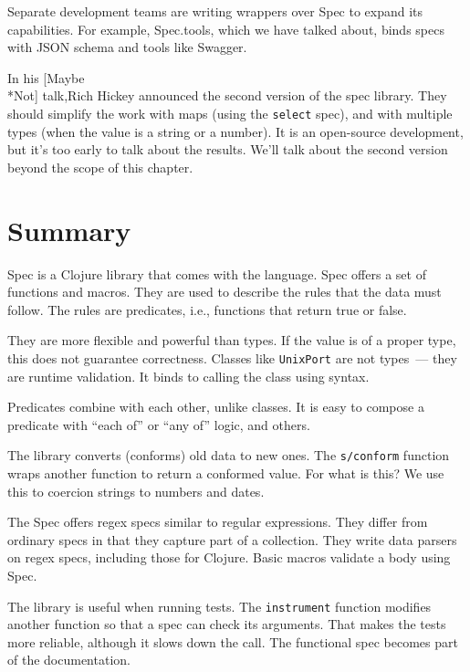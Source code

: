 Separate development teams are writing wrappers over Spec to expand its capabilities. For example, Spec.tools, which we have talked about, binds specs with JSON schema and tools like Swagger.


In his [Maybe\\*Not] talk,Rich Hickey announced the second version of the spec library. They should simplify the work with maps (using the \verb|select| spec), and with multiple types (when the value is a string or a number). It is an open-source development, but it's too early to talk about the results. We'll talk about the second version beyond the scope of this chapter.

\section{Summary}

Spec is a Clojure library that comes with the language. Spec offers a set of functions and macros. They are used to describe the rules that the data must follow. The rules are predicates, i.e., functions that return true or false.

They are more flexible and powerful than types. If the value is of a proper type, this does not guarantee correctness. Classes like \verb|UnixPort| are not types~--- they are runtime validation. It binds to calling the class using syntax.

Predicates combine with each other, unlike classes. It is easy to compose a predicate with “each of” or “any of” logic, and others. 

The library converts (conforms) old data to new ones. The \verb|s/conform| function wraps another function to return a conformed value. For what is this? We use this to coercion strings to numbers and dates.

The Spec offers regex specs similar to regular expressions. They differ from ordinary specs in that they capture part of a collection. They write data parsers on regex specs, including those for Clojure. Basic macros validate a body using Spec.

The library is useful when running tests. The \verb|instrument| function modifies another function so that a spec can check its arguments. That makes the tests more reliable, although it slows down the call. The functional spec becomes part of the documentation.
